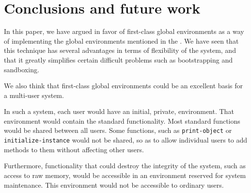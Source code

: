 \section{Conclusions and future work}

In this paper, we have argued in favor of first-class global
environments as a way of implementing the global environments
mentioned in the \hs{}.  We have seen that this technique has several
advantages in terms of flexibility of the system, and that it greatly
simplifies certain difficult problems such as bootstrapping and
sandboxing.

We also think that first-class global environments could be an
excellent basis for a multi-user \commonlisp{} system.

In such a system, each user would have an initial, private,
environment.  That environment would contain the standard
\commonlisp{} functionality.  Most standard \commonlisp{} functions
would be shared between all users.  Some functions, such as
\texttt{print-object} or \texttt{initialize-instance} would not be
shared, so as to allow individual users to add methods to them without
affecting other users.

Furthermore, functionality that could destroy the integrity of the
system, such as access to raw memory, would be accessible in an
environment reserved for system maintenance.  This environment would
not be accessible to ordinary users.
